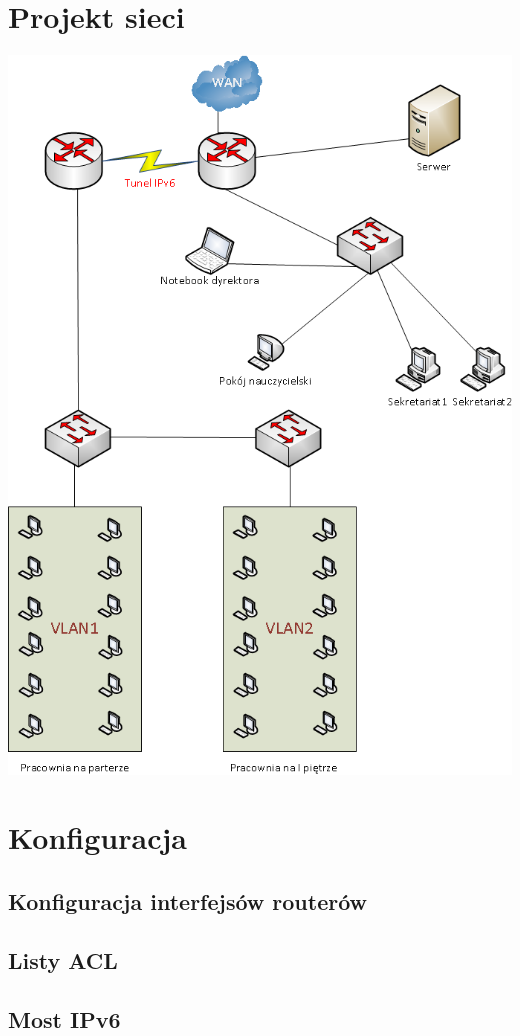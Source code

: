 \documentclass[11pt,a4paper]{article}
\begin{document}
\section{Projekt sieci}
\includegraphics[scale=0.6]{siec.png}  

\section{Konfiguracja}
\subsection{Konfiguracja interfejsów routerów}
\subsection{Listy ACL}
\subsection{Most IPv6}
\end{document}
